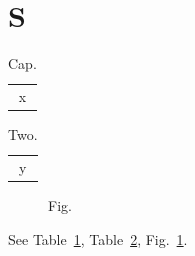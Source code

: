 \documentclass[aps,prl]{revtex4-1}
\begin{document}
\section{S}
\begin{table}\caption{Cap.}\label{t}\begin{tabular}{c}x\end{tabular}\end{table}
\begin{table}\caption{Two.}\label{u}\begin{tabular}{c}y\end{tabular}\end{table}
\begin{figure}\caption{Fig.}\label{f}\end{figure}
See Table~\ref{t}, Table~\ref{u}, Fig.~\ref{f}.
\end{document}
